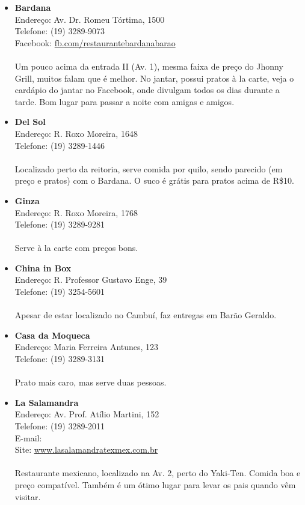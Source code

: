 \begin{itemize}
\item \textbf{Bardana}
  \\Endereço: Av. Dr. Romeu Tórtima, 1500
  \\Telefone: (19) 3289-9073
  \\Facebook: \url{fb.com/restaurantebardanabarao}
  \\
  \\Um pouco acima da entrada II (Av. 1), mesma faixa de preço do Jhonny Grill,
  muitos falam que é melhor. No jantar, possui pratos à la carte, veja o
  cardápio do jantar no Facebook, onde divulgam todos os dias durante a tarde.
  Bom lugar para passar a noite com amigas e amigos.

\item \textbf{Del Sol}
  \\Endereço: R. Roxo Moreira, 1648
  \\Telefone: (19) 3289-1446
  \\
  \\Localizado perto da reitoria, serve comida por quilo, sendo parecido (em
  preço e pratos) com o Bardana. O suco é grátis para pratos acima de R\$10.

\item \textbf{Ginza}
  \\Endereço: R. Roxo Moreira, 1768
  \\Telefone: (19) 3289-9281
  \\
  \\Serve à la carte com preços bons.

\item \textbf{China in Box}
  \\Endereço: R. Professor Gustavo Enge, 39
  \\Telefone: (19) 3254-5601
  \\
  \\Apesar de estar localizado no Cambuí, faz entregas em Barão Geraldo.

\item \textbf{Casa da Moqueca}
  \\Endereço: Maria Ferreira Antunes, 123
  \\Telefone: (19) 3289-3131
  \\
  \\Prato mais caro, mas serve duas pessoas.

\item \textbf{La Salamandra}
  \\Endereço: Av. Prof. Atílio Martini, 152
  \\Telefone: (19) 3289-2011
  \\E-mail: 
  \\Site: \url{www.lasalamandratexmex.com.br}
  \\
  \\Restaurante mexicano, localizado na Av. 2, perto do Yaki-Ten. Comida boa e
  preço compatível. Também é um ótimo lugar para levar os pais quando vêm
  visitar.


\end{itemize}
